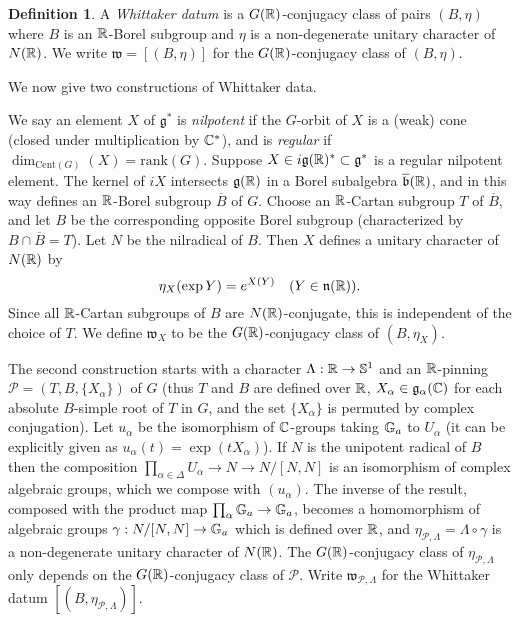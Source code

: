 \documentclass{article}
\theoremstyle{definition}
\newtheorem{dfn}[thm]{Definition}
\numberwithin{equation}{section}
\renewcommand{\-}{\hyp{}}
\newcommand{\n}{\mathfrak n}
\newcommand{\g}{\mathfrak g}
\renewcommand{\P}{\mathcal P}
\newcommand{\w}{\mathfrak w}
\newcommand{\Cent}{\mathrm{Cent}}
\begin{document}
\begin{dfn} \label{dfn:whit}
A  \emph{Whittaker datum} is a $G(\mathbb{R})$-conjugacy class of  pairs  $(B,\eta)$ where $B$ is an $\mathbb{R}$-Borel subgroup
	and $\eta$ is a non-degenerate unitary character of $N(\mathbb{R})$. We  write $\w=[(B,\eta)]$ for the $G(\mathbb{R})$-conjugacy class of $(B,\eta)$. 		
\end{dfn}

We  now give two constructions of Whittaker data.

We say an element $X$ of $\g^*$ is \emph{nilpotent} if the $G$-orbit of $X$
is a (weak) cone (closed under multiplication by $\mathbb{C}^*$), and is
\emph{regular} if $\dim_{\Cent(G)}(X)=\mathrm{rank}(G)$.  Suppose
$X\in i\g(\R)^*\subset \g^*$ is a regular nilpotent element.  The
kernel of $iX$ intersects $\g(\R)$ in a Borel subalgebra $\overline{\mathfrak b}(\mathbb{R})$, and in this way defines an $\mathbb{R}$-Borel subgroup $\overline B$ of $G$.
Choose an $\mathbb{R}$-Cartan subgroup $T$ of
$\overline B$, and let $B$ be the corresponding opposite Borel
subgroup (characterized by $B\cap \overline B=T$). 
Let $N$ be the nilradical of $B$.  Then $X$ defines a unitary
character of $N(\mathbb{R})$ by
\[ 
\eta_X(\exp Y)=e^{X(Y)}\quad (Y\in\n(\R)).
\] 
Since all $\mathbb{R}$-Cartan subgroups of $B$ are $N(\mathbb{R})$-conjugate,
\cite[Theorem 19.2]{Bor91} this is independent of the choice of $T$. We define $\w_X$ to be the $G(\mathbb{R})$-conjugacy class of $(B,\eta_X)$. 

The second construction starts with a character $\Lambda : \mathbb{R} \to \mathbb{S}^1$ and an $\mathbb{R}$-pinning $\P=(T,B,\{X_\alpha\})$ of $G$ (thus $T$ and $B$ are defined over $\mathbb{R}$, $X_\alpha \in \mathfrak{g}_\alpha(\mathbb{C})$ for each absolute $B$-simple root of $T$ in $G$, and the set $\{X_\alpha\}$ is permuted by complex conjugation).  
Let $u_\alpha$ be the isomorphism of $\mathbb{C}$-groups taking $\mathbb{G}_a$ to $U_\alpha$ (it can be explicitly given as $u_\alpha(t)=\exp(t X_\alpha)$). 
If $N$ is the unipotent radical of $B$ then the
composition $\prod_{\alpha \in \Delta} U_\alpha \to N \to N/[N,N]$ is
an isomorphism of complex algebraic groups, which we compose with
$(u_\alpha)$. The inverse of the result, composed with the product map
$\prod_\alpha \mathbb{G}_a \to \mathbb{G}_a$, becomes a homomorphism of
algebraic groups $\gamma : N/[N,N] \to \mathbb{G}_a$ which is  defined over $\mathbb{R}$, and 
 $\eta_{\P,\Lambda}=\Lambda\circ \gamma$ is a non-degenerate unitary character of $N(\mathbb{R})$.
The $G(\mathbb{R})$-conjugacy class of $\eta_{\P,\Lambda}$ only depends on the $G(\mathbb{R})$-conjugacy class of  $\P$.
  Write $\w_{\P,\Lambda}$ for the Whittaker datum
$[(B,\eta_{\P,\Lambda})]$. 
\end{document}
